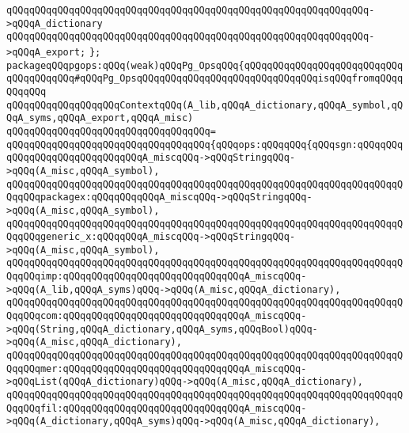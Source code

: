 \verb|qQQqqQQqqQQqqQQqqQQqqQQqqQQqqQQqqQQqqQQqqQQqqQQqqQQqqQQqqQQqqQQq->qQQqA_dictionary|\newline
\verb|qQQqqQQqqQQqqQQqqQQqqQQqqQQqqQQqqQQqqQQqqQQqqQQqqQQqqQQqqQQqqQQq->qQQqA_export;|\newline
\verb|};|\newline
\newline
\verb|packageqQQqpgops:qQQq(weak)qQQqPg_OpsqQQq{qQQqqQQqqQQqqQQqqQQqqQQqqQQqqQQqqQQqqQQq#qQQqPg_OpsqQQqqQQqqQQqqQQqqQQqqQQqqQQqqQQqisqQQqfromqQQqqQQqqQQq|\newline
\newline
\verb|qQQqqQQqqQQqqQQqqQQqContextqQQq(A_lib,qQQqA_dictionary,qQQqA_symbol,qQQqA_syms,qQQqA_export,qQQqA_misc)|\newline
\verb|qQQqqQQqqQQqqQQqqQQqqQQqqQQqqQQqqQQq=|\newline
\verb|qQQqqQQqqQQqqQQqqQQqqQQqqQQqqQQqqQQq{qQQqops:qQQqqQQq{qQQqsgn:qQQqqQQqqQQqqQQqqQQqqQQqqQQqqQQqA_miscqQQq->qQQqStringqQQq->qQQq(A_misc,qQQqA_symbol),|\newline
\verb|qQQqqQQqqQQqqQQqqQQqqQQqqQQqqQQqqQQqqQQqqQQqqQQqqQQqqQQqqQQqqQQqqQQqqQQqqQQqpackagex:qQQqqQQqqQQqA_miscqQQq->qQQqStringqQQq->qQQq(A_misc,qQQqA_symbol),|\newline
\verb|qQQqqQQqqQQqqQQqqQQqqQQqqQQqqQQqqQQqqQQqqQQqqQQqqQQqqQQqqQQqqQQqqQQqqQQqqQQqgeneric_x:qQQqqQQqA_miscqQQq->qQQqStringqQQq->qQQq(A_misc,qQQqA_symbol),|\newline
\newline
\verb|qQQqqQQqqQQqqQQqqQQqqQQqqQQqqQQqqQQqqQQqqQQqqQQqqQQqqQQqqQQqqQQqqQQqqQQqqQQqimp:qQQqqQQqqQQqqQQqqQQqqQQqqQQqqQQqA_miscqQQq->qQQq(A_lib,qQQqA_syms)qQQq->qQQq(A_misc,qQQqA_dictionary),|\newline
\verb|qQQqqQQqqQQqqQQqqQQqqQQqqQQqqQQqqQQqqQQqqQQqqQQqqQQqqQQqqQQqqQQqqQQqqQQqqQQqcom:qQQqqQQqqQQqqQQqqQQqqQQqqQQqqQQqA_miscqQQq->qQQq(String,qQQqA_dictionary,qQQqA_syms,qQQqBool)qQQq->qQQq(A_misc,qQQqA_dictionary),|\newline
\verb|qQQqqQQqqQQqqQQqqQQqqQQqqQQqqQQqqQQqqQQqqQQqqQQqqQQqqQQqqQQqqQQqqQQqqQQqqQQqmer:qQQqqQQqqQQqqQQqqQQqqQQqqQQqqQQqA_miscqQQq->qQQqList(qQQqA_dictionary)qQQq->qQQq(A_misc,qQQqA_dictionary),|\newline
\verb|qQQqqQQqqQQqqQQqqQQqqQQqqQQqqQQqqQQqqQQqqQQqqQQqqQQqqQQqqQQqqQQqqQQqqQQqqQQqfil:qQQqqQQqqQQqqQQqqQQqqQQqqQQqqQQqA_miscqQQq->qQQq(A_dictionary,qQQqA_syms)qQQq->qQQq(A_misc,qQQqA_dictionary),|\newline
